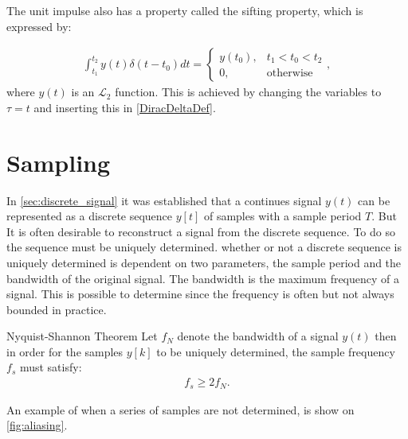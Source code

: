 \noindent The unit impulse also has a property called the sifting property, which is expressed by:

\begin{align*}
\int_{t_1}^{t_2} y(t) \delta(t-t_0)dt = 
    \begin{cases}
    y(t_0),& t_1<t_0<t_2\\
    0, & \text{otherwise}
\end{cases},
\end{align*}
where $y(t)$ is an $\mathcal{L}_2$ function. This is achieved by changing the variables to $\tau =t$ and inserting this in \autoref{DiracDeltaDef}.\cite{LectureNotes}

\chapter{Sampling}



In \autoref{sec:discrete_signal} it was established that a continues signal $y(t)$ can be represented as a discrete sequence $y[t]$ of samples with a sample period $T$. But  \\
It is often desirable to reconstruct a signal from the discrete sequence. To do so the sequence must be uniquely determined. whether or not a discrete sequence is uniquely determined is dependent on two parameters, the sample period and the bandwidth of the original signal. The bandwidth is the maximum frequency of a signal. This is possible to determine since the frequency is often but not always bounded in practice.   

\begin{theorem}{Nyquist-Shannon Theorem}
    \label{the:Nyquist-Shannon}
    Let $f_N$ denote the bandwidth of a signal $y(t)$ then in order for the samples $y[k]$ to be uniquely determined, the sample frequency $f_s$ must satisfy:
    \begin{align*}
        f_s \geq 2f_N.
    \end{align*}
    \cite[397]{mandal2007continuous}
\end{theorem}

\noindent An example of when a series of samples are not determined, is show on \autoref{fig:aliasing}. 

